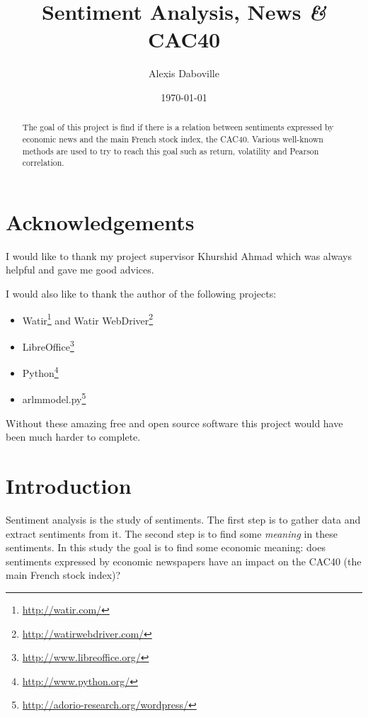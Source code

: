 \documentclass[12pt]{report}
\newcommand{\amp}{{\fontfamily{ppl}\selectfont\emph\&}}
\begin{document}
\onehalfspace

\title{Sentiment Analysis, News \amp{} CAC40}
\date{\today}
\author{Alexis Daboville}

\maketitle

\begin{abstract}
	The goal of this project is find if there is a relation between sentiments expressed by economic news and the main French stock index, the CAC40. Various well-known methods are used to try to reach this goal such as return, volatility and Pearson correlation.
\end{abstract}

\pagestyle{headings}
\tableofcontents
\listoffigures
\listoftables

\newpage

\chapter*{Acknowledgements}
I would like to thank my project supervisor Khurshid Ahmad which was always helpful and gave me good advices.

I would also like to thank the author of the following projects:
\begin{itemize}
	\item Watir\footnote{\url{http://watir.com/}} and Watir WebDriver\footnote{\url{http://watirwebdriver.com/}}
	\item LibreOffice\footnote{\url{http://www.libreoffice.org/}}
	\item Python\footnote{\url{http://www.python.org/}}
	\item arlmmodel.py\footnote{\url{http://adorio-research.org/wordpress/}}
\end{itemize}
Without these amazing free and open source software this project would have been much harder to complete.

\chapter{Introduction}

Sentiment analysis is the study of sentiments. The first step is to gather data and extract sentiments from it. The second step is to find some \emph{meaning} in these sentiments. In this study the goal is to find some economic meaning: does sentiments expressed by economic newspapers have an impact on the CAC40 (the main French stock index)?
\end{document}

